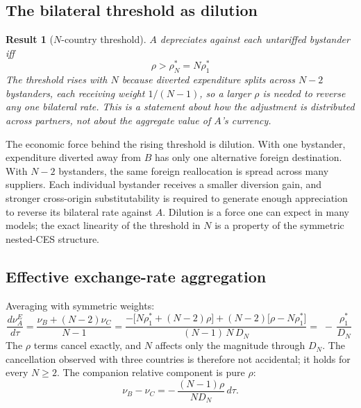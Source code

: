\documentclass[11pt]{article}
\newtheorem{result}{Result}[section]
\begin{document}
\subsection{The bilateral threshold as dilution}

\begin{result}[$N$-country threshold]
$A$ depreciates against each untariffed bystander iff
\begin{equation}
\boxed{\;\rho > \rho_N^* = N \rho_1^* \;}
\end{equation}
The threshold rises with $N$ because diverted expenditure splits across $N-2$ bystanders, each receiving weight $1/(N-1)$, so a larger $\rho$ is needed to reverse any one bilateral rate. This is a statement about how the adjustment is distributed across partners, not about the aggregate value of $A$'s currency.
\end{result}

The economic force behind the rising threshold is dilution. With one bystander, expenditure diverted away from $B$ has only one alternative foreign destination. With $N-2$ bystanders, the same foreign reallocation is spread across many suppliers. Each individual bystander receives a smaller diversion gain, and stronger cross-origin substitutability is required to generate enough appreciation to reverse its bilateral rate against $A$. Dilution is a force one can expect in many models; the exact linearity of the threshold in $N$ is a property of the symmetric nested-CES structure.

\subsection{Effective exchange-rate aggregation}

Averaging with symmetric weights:
\begin{equation}
\frac{d\nu_A^E}{d\tau}
= \frac{\nu_B + (N-2)\nu_C}{N-1}
= \frac{-\big[N\rho_1^* + (N-2)\rho\big] + (N-2)\big[\rho - N\rho_1^*\big]}{(N-1)\, N\, D_N}
= \boxed{\; -\,\frac{\rho_1^*}{D_N} \;}
\label{eq:N-neer}
\end{equation}
The $\rho$ terms cancel exactly, and $N$ affects only the magnitude through $D_N$. The cancellation observed with three countries is therefore not accidental; it holds for every $N \geq 2$. The companion relative component is pure $\rho$:
\begin{equation}
\nu_B - \nu_C = -\,\frac{(N-1)\rho}{N D_N}\, d\tau .
\label{eq:N-decomp}
\end{equation}
\end{document}
